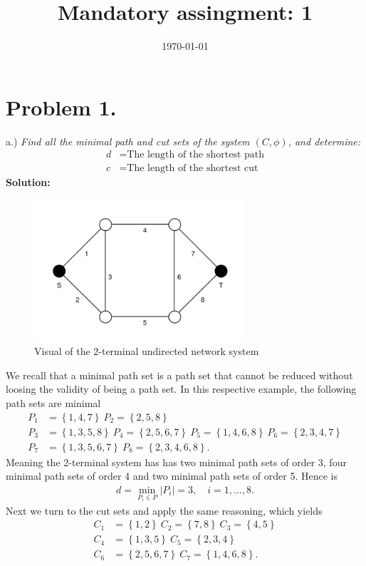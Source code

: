 \documentclass[12pt,
               a4paper,
               article,
               oneside,
               english,oldfontcommands]{memoir}
\date{\today}
\title{Mandatory assingment: 1}
\newcommand{\bl}{\left\{}
\newcommand{\br}{\right\}}
\newcommand{\spaze}{\vspace{4mm}\\}
\begin{document}
\header{}
\section*{\centering Problem 1.}
a.) \emph{Find all the minimal path and cut sets of the system $(C,\phi)$, and determine:}
\begin{align*}
d &= \text{The length of the shortest path} \\[5pt] 
c &= \text{The length of the shortest cut}
\end{align*}
\textbf{Solution:} \spaze
\begin{figure}[H]
\centering 
\includegraphics[width=0.7\textwidth]{2-bridge.pdf}
\caption{Visual of the 2-terminal undirected network system}
\end{figure}
We recall that a minimal path set is a path set that cannot be reduced without loosing the validity of being a path set. In this respective example, the following path sets are minimal 
\begin{align*}
P_1 &= \bl 1, 4, 7\br \ P_2 = \bl 2, 5, 8\br  \\[5pt]
P_3 &= \bl 1, 3, 5, 8\br \ P_4 = \bl 2, 5,6,  7\br \ P_5 = \bl 1, 4, 6, 8\br \ P_6 = \bl 2, 3, 4, 7\br  \\[5pt]
P_7 &= \bl 1, 3, 5, 6, 7\br  \ P_8 = \bl 2, 3, 4, 6, 8\br.
\end{align*}
Meaning the 2-terminal system has has two minimal path sets of order 3, four minimal path sets of order 4 and two minimal path sets of order 5. Hence is 
\begin{align*}
d = \min_{P_{i} \in P} |P_{i}|= 3, \quad i = 1, \ldots, 8.
\end{align*}
Next we turn to the cut sets and apply the same reasoning, which yields
\begin{align*}
C_1 &= \bl 1, 2\br \ C_2 = \bl 7, 8 \br  \ C_3 = \bl 4, 5 \br \\[5pt]
C_4 &= \bl 1,3, 5\br \ C_5 = \bl 2,3,4\br  \\[5pt]
C_6 &= \bl 2,5,6, 7\br \ C_7 = \bl 1,4,6, 8\br.
\end{align*}
\end{document}
